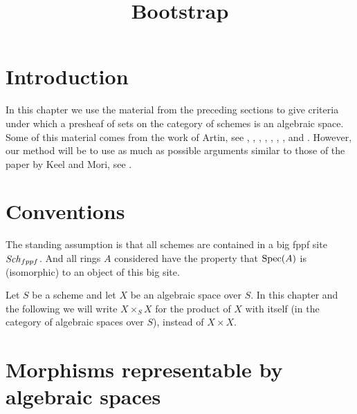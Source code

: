 

%


\title{Bootstrap}

\maketitle

\label{section-phantom}

\tableofcontents




\section{Introduction}
\label{section-introduction}

\noindent
In this chapter we use the material from the preceding sections to
give criteria under which a presheaf of sets on the category of schemes
is an algebraic space. Some of this material comes from the work
of Artin, see \cite{ArtinI}, \cite{ArtinII},
\cite{Artin-Theorem-Representability},
\cite{Artin-Construction-Techniques},
\cite{Artin-Algebraic-Spaces},
\cite{Artin-Algebraic-Approximation},
\cite{Artin-Implicit-Function},
and \cite{ArtinVersal}.
However, our method will be to use as much as possible arguments
similar to those of the paper by Keel and Mori, see
\cite{K-M}.

\section{Conventions}
\label{section-conventions}

\noindent
The standing assumption is that all schemes are contained in
a big fppf site $\mathit{Sch}_{fppf}$. And all rings $A$ considered
have the property that $\mathop{\mathrm{Spec}}(A)$ is (isomorphic) to an
object of this big site.

\medskip\noindent
Let $S$ be a scheme and let $X$ be an algebraic space over $S$.
In this chapter and the following we will write $X \times_S X$
for the product of $X$ with itself (in the category of algebraic
spaces over $S$), instead of $X \times X$.




\section{Morphisms representable by algebraic spaces}
\label{section-morphism-representable-by-spaces}

